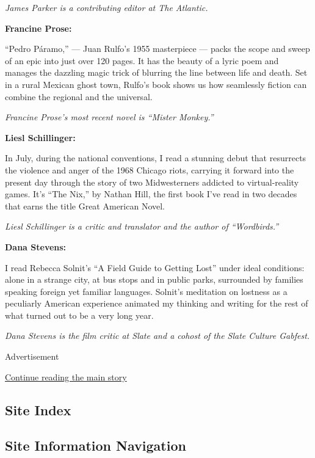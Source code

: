 \emph{James Parker is a contributing editor at The Atlantic.}

\textbf{Francine Prose:}

``Pedro Páramo,'' --- Juan Rulfo's 1955 masterpiece --- packs the scope
and sweep of an epic into just over 120 pages. It has the beauty of a
lyric poem and manages the dazzling magic trick of blurring the line
between life and death. Set in a rural Mexican ghost town, Rulfo's book
shows us how seamlessly fiction can combine the regional and the
universal.

\emph{Francine Prose's most recent novel is ``Mister Monkey.''}

\textbf{Liesl Schillinger:}

In July, during the national conventions, I read a stunning debut that
resurrects the violence and anger of the 1968 Chicago riots, carrying it
forward into the present day through the story of two Midwesterners
addicted to virtual-reality games. It's ``The Nix,'' by Nathan Hill, the
first book I've read in two decades that earns the title Great American
Novel.

\emph{Liesl Schillinger is a critic and translator and the author of
``Wordbirds.''}

\textbf{Dana Stevens:}

I read Rebecca Solnit's ``A Field Guide to Getting Lost'' under ideal
conditions: alone in a strange city, at bus stops and in public parks,
surrounded by families speaking foreign yet familiar languages. Solnit's
meditation on lostness as a peculiarly American experience animated my
thinking and writing for the rest of what turned out to be a very long
year.

\emph{Dana Stevens is the film critic at Slate and a cohost of the Slate
Culture Gabfest.}

Advertisement

\protect\hyperlink{after-bottom}{Continue reading the main story}

\hypertarget{site-index}{%
\subsection{Site Index}\label{site-index}}

\hypertarget{site-information-navigation}{%
\subsection{Site Information
Navigation}\label{site-information-navigation}}

